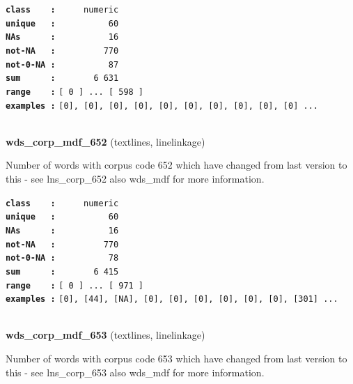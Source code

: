 \documentclass[]{article}
\begin{document}
\textbf{\texttt{class\ \ \ \ :}} \texttt{~~~~~numeric}\\
\textbf{\texttt{unique\ \ \ :}} \texttt{~~~~~~~~~~60}\\
\textbf{\texttt{NAs\ \ \ \ \ \ :}} \texttt{~~~~~~~~~~16}\\
\textbf{\texttt{not-NA\ \ \ :}} \texttt{~~~~~~~~~770}\\
\textbf{\texttt{not-0-NA\ :}} \texttt{~~~~~~~~~~87}\\
\textbf{\texttt{sum\ \ \ \ \ \ :}} \texttt{~~~~~~~6~631}\\
\textbf{\texttt{range\ \ \ \ :}}
\texttt{{[}\ 0\ {]}\ ...\ {[}\ 598\ {]}}\\
\textbf{\texttt{examples\ :}}
\texttt{{[}0{]},\ {[}0{]},\ {[}0{]},\ {[}0{]},\ {[}0{]},\ {[}0{]},\ {[}0{]},\ {[}0{]},\ {[}0{]},\ {[}0{]}\ ...}\\

~

\textbf{wds\_corp\_mdf\_652} (textlines, linelinkage)

Number of words with corpus code 652 which have changed from last
version to this - see lns\_corp\_652 also wds\_mdf for more information.

\textbf{\texttt{class\ \ \ \ :}} \texttt{~~~~~numeric}\\
\textbf{\texttt{unique\ \ \ :}} \texttt{~~~~~~~~~~60}\\
\textbf{\texttt{NAs\ \ \ \ \ \ :}} \texttt{~~~~~~~~~~16}\\
\textbf{\texttt{not-NA\ \ \ :}} \texttt{~~~~~~~~~770}\\
\textbf{\texttt{not-0-NA\ :}} \texttt{~~~~~~~~~~78}\\
\textbf{\texttt{sum\ \ \ \ \ \ :}} \texttt{~~~~~~~6~415}\\
\textbf{\texttt{range\ \ \ \ :}}
\texttt{{[}\ 0\ {]}\ ...\ {[}\ 971\ {]}}\\
\textbf{\texttt{examples\ :}}
\texttt{{[}0{]},\ {[}44{]},\ {[}NA{]},\ {[}0{]},\ {[}0{]},\ {[}0{]},\ {[}0{]},\ {[}0{]},\ {[}0{]},\ {[}301{]}\ ...}\\

~

\textbf{wds\_corp\_mdf\_653} (textlines, linelinkage)

Number of words with corpus code 653 which have changed from last
version to this - see lns\_corp\_653 also wds\_mdf for more information.
\end{document}
